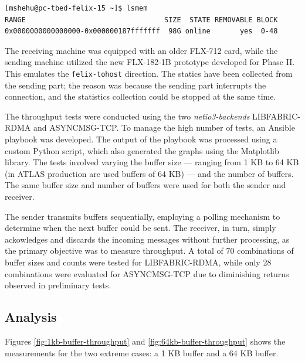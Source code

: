 \begin{lstlisting}[caption={Memory information}, label={lst:memory}]
[mshehu@pc-tbed-felix-15 ~]$ lsmem
RANGE                                 SIZE  STATE REMOVABLE BLOCK
0x0000000000000000-0x000000187fffffff  98G online       yes  0-48
\end{lstlisting}

The receiving machine was equipped with an older FLX-712 card, while the sending machine utilized the new FLX-182-1B prototype developed for Phase II. This emulates the \texttt{felix-tohost} direction. The statics have been collected from the sending part; the reason was because the sending part interrupts the connection, and the statistics collection could be stopped at the same time.

The throughput tests were conducted using the two \textit{netio3-backends} LIBFABRIC-RDMA and ASYNCMSG-TCP. To manage the high number of tests, an Ansible \cite{ansible} playbook was developed. The output of the playbook was processed using a custom Python script, which also generated the graphs using the Matplotlib \cite{matplotlib} library. The tests involved varying the buffer size --- ranging from 1 KB to 64 KB  (in ATLAS production are used buffers of 64 KB) --- and the number of buffers. The same buffer size and number of buffers were used for both the sender and receiver. 

The sender transmits buffers sequentially, employing a polling mechanism to determine when the next buffer could be sent. The receiver, in turn, simply ackowledges and discards the incoming messages without further processing, as the primary objective was to measure throughput. A total of 70 combinations of buffer sizes and counts were tested for LIBFABRIC-RDMA, while only 28 combinations were evaluated for ASYNCMSG-TCP due to diminishing returns observed in preliminary tests.

\subsection{Analysis}

Figures \ref{fig:1kb-buffer-throughput} and \ref{fig:64kb-buffer-throughput} shows the measurements for the two extreme cases: a 1 KB buffer and a 64 KB buffer.

